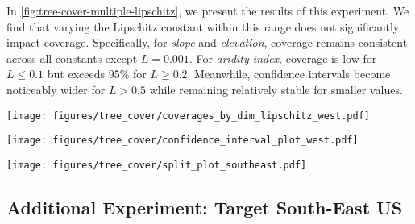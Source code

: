 In \cref{fig:tree-cover-multiple-lipschitz}, we present the results of this experiment. We find that varying the Lipschitz constant within this range does not significantly impact coverage. Specifically, for \textit{slope} and \textit{elevation}, coverage remains consistent across all constants except $L = 0.001$. For \textit{aridity index}, coverage is low for $L \leq 0.1$ but exceeds $95\%$ for $L \geq 0.2$. Meanwhile, confidence intervals become noticeably wider for $L > 0.5$ while remaining relatively stable for smaller values.


\begin{figure*}
    \centering
    \texttt{[image: figures/tree\_cover/coverages\_by\_dim\_lipschitz\_west.pdf]}
    \caption{Coverage and average confidence interval widths over 250 seeds for 9 different values for the Lipschitz constant $L \in \{0.001, 0.005, 0.01, 0.02, 0.05, 0.1, 0.2, 0.5, 1\}$. The horizontal axis is shared across all plots.}
    \label{fig:tree-cover-multiple-lipschitz}
\end{figure*}

\begin{figure*}
    \centering    \texttt{[image: figures/tree\_cover/confidence\_interval\_plot\_west.pdf]}
    \caption{Confidence intervals for different seeds for the West US. Each row shows confidence intervals for the various methods over the three parameters for a given seed. The dashed vertical lines represent the true parameters (black is the point estimate, orange is a 95\% confidence interval). The blue dots the point estimates for the different methods, and the blue lines are the confidence intervals.}
    \label{fig:tree-cover-conf-intervals-west}
\end{figure*}


\begin{figure*}
    \centering
    \texttt{[image: figures/tree\_cover/split\_plot\_southeast.pdf]}
    \caption{Spatial sites for the source (blue) and target (orange) data. The target data are chosen from the south-eastern part of the CONUS, whereas the source data cover the whole region.}
    \label{fig:tree-cover-split-southeast}
\end{figure*}

\subsection{Additional Experiment: Target South-East US}
\label{app:tree-cover-southeast}

